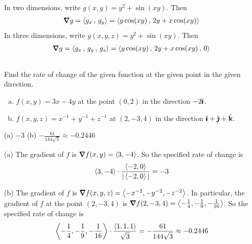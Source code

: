 \begin{solution}
In two dimensions, write $g(x,y) = y^2+\sin(xy)$. Then
\begin{align*}
\vnabla g =\llt g_x\,,\,g_y\rgt
          =\llt y\cos(xy)\,,\, 2y + x\cos(xy) \rgt 
\end{align*}
In three dimensions, write $g(x,y,z) = y^2+\sin(xy)$. Then
\begin{align*}
\vnabla g =\llt g_x\,,\,g_y\,,\,g_z\rgt
          =\llt y\cos(xy)\,,\, 2y + x\cos(xy)\,,\, 0 \rgt 
\end{align*}
\end{solution}

\subsection*{\Procedural}

\begin{question}
Find the rate of change of the given function at the given point in
the given direction. 
\begin{enumerate}[(a)]
\item
$f(x,y)=3x-4y$ at the point $(0,2)$ in the direction $-2\hat{\pmb{\imath}}$.
\item
$f(x,y,z)=x^{-1}+y^{-1}+z^{-1}$ at $(2,-3,4)$ in the direction
$\hat{\pmb{\imath}}+\hat{\pmb{\jmath}}+\hat{\mathbf{k}}$.
\end{enumerate}
\end{question}

%

\begin{answer}
(a) $-3$\qquad
(b) $-\frac{61}{144\sqrt{3}}\approx-0.2446$
\end{answer}

\begin{solution}
(a)
The gradient of $f$ is $\vnabla f(x,y)=\llt 3,-4\rgt$. So the specified rate of change is
\begin{equation*}
\left< 3,-4\right>\cdot\frac{\left< -2,0\right>}{|\left< -2,0\right>|}=-3
\end{equation*}

(b)
The gradient of $f$ is
  $\vnabla f(x,y,z)=\llt -x^{-2},-y^{-2},-z^{-2}\rgt$. In particular,
the gradient of $f$ at the point $(2,-3,4)$ is
$\vnabla f(2,-3,4)=\llt -\frac{1}{4},-\frac{1}{9},-\frac{1}{16}\rgt$.
So the specified rate of change is
\begin{equation*} 
\left< -\frac{1}{4},-\frac{1}{9},-\frac{1}{16}\right>\cdot
        \frac{\left< 1,1,1\right>}{\sqrt{3}}=
        -\frac{61}{144\sqrt{3}}\approx-0.2446
\end{equation*}
\end{solution}

